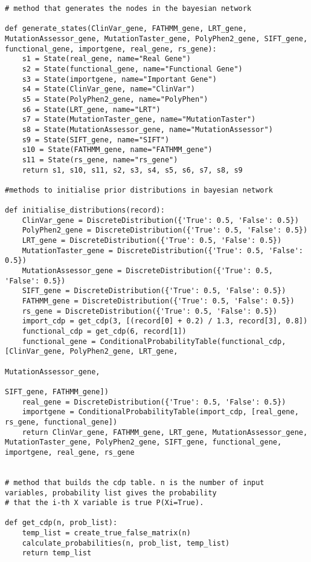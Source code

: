 \documentclass{article}
\begin{document}
\begin{verbatim}
# method that generates the nodes in the bayesian network

def generate_states(ClinVar_gene, FATHMM_gene, LRT_gene, MutationAssessor_gene, MutationTaster_gene, PolyPhen2_gene, SIFT_gene, functional_gene, importgene, real_gene, rs_gene):
    s1 = State(real_gene, name="Real Gene")
    s2 = State(functional_gene, name="Functional Gene")
    s3 = State(importgene, name="Important Gene")
    s4 = State(ClinVar_gene, name="ClinVar")
    s5 = State(PolyPhen2_gene, name="PolyPhen")
    s6 = State(LRT_gene, name="LRT")
    s7 = State(MutationTaster_gene, name="MutationTaster")
    s8 = State(MutationAssessor_gene, name="MutationAssessor")
    s9 = State(SIFT_gene, name="SIFT")
    s10 = State(FATHMM_gene, name="FATHMM_gene")
    s11 = State(rs_gene, name="rs_gene")
    return s1, s10, s11, s2, s3, s4, s5, s6, s7, s8, s9

#methods to initialise prior distributions in bayesian network

def initialise_distributions(record):
    ClinVar_gene = DiscreteDistribution({'True': 0.5, 'False': 0.5})
    PolyPhen2_gene = DiscreteDistribution({'True': 0.5, 'False': 0.5})
    LRT_gene = DiscreteDistribution({'True': 0.5, 'False': 0.5})
    MutationTaster_gene = DiscreteDistribution({'True': 0.5, 'False': 0.5})
    MutationAssessor_gene = DiscreteDistribution({'True': 0.5, 'False': 0.5})
    SIFT_gene = DiscreteDistribution({'True': 0.5, 'False': 0.5})
    FATHMM_gene = DiscreteDistribution({'True': 0.5, 'False': 0.5})
    rs_gene = DiscreteDistribution({'True': 0.5, 'False': 0.5})
    import_cdp = get_cdp(3, [(record[0] + 0.2) / 1.3, record[3], 0.8])
    functional_cdp = get_cdp(6, record[1])
    functional_gene = ConditionalProbabilityTable(functional_cdp, [ClinVar_gene, PolyPhen2_gene, LRT_gene,
                                                                   MutationAssessor_gene,
                                                                   SIFT_gene, FATHMM_gene])
    real_gene = DiscreteDistribution({'True': 0.5, 'False': 0.5})
    importgene = ConditionalProbabilityTable(import_cdp, [real_gene, rs_gene, functional_gene])
    return ClinVar_gene, FATHMM_gene, LRT_gene, MutationAssessor_gene, MutationTaster_gene, PolyPhen2_gene, SIFT_gene, functional_gene, importgene, real_gene, rs_gene


# method that builds the cdp table. n is the number of input variables, probability list gives the probability
# that the i-th X variable is true P(Xi=True).

def get_cdp(n, prob_list):
    temp_list = create_true_false_matrix(n)
    calculate_probabilities(n, prob_list, temp_list)
    return temp_list



\end{verbatim}
\end{document}
